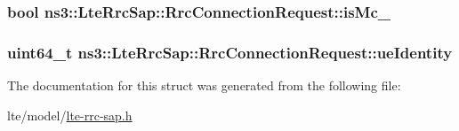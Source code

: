\subsubsection[{\texorpdfstring{is\+Mc\+\_\+2}{isMc_2}}]{\setlength{\rightskip}{0pt plus 5cm}bool ns3\+::\+Lte\+Rrc\+Sap\+::\+Rrc\+Connection\+Request\+::is\+Mc\+\_}\hypertarget{structns3_1_1LteRrcSap_1_1RrcConnectionRequest_a6c7b19570aec22b302a4ba896a9f4aaf}{}\label{structns3_1_1LteRrcSap_1_1RrcConnectionRequest_a6c7b19570aec22b302a4ba896a9f4aaf}
\subsubsection[{\texorpdfstring{ue\+Identity}{ueIdentity}}]{\setlength{\rightskip}{0pt plus 5cm}uint64\+\_\+t ns3\+::\+Lte\+Rrc\+Sap\+::\+Rrc\+Connection\+Request\+::ue\+Identity}\hypertarget{structns3_1_1LteRrcSap_1_1RrcConnectionRequest_ad6475f1d8216fa091d0f42866197eee5}{}\label{structns3_1_1LteRrcSap_1_1RrcConnectionRequest_ad6475f1d8216fa091d0f42866197eee5}


The documentation for this struct was generated from the following file\+:\begin{DoxyCompactItemize}
\item 
lte/model/\hyperlink{lte-rrc-sap_8h}{lte-\/rrc-\/sap.\+h}\end{DoxyCompactItemize}
